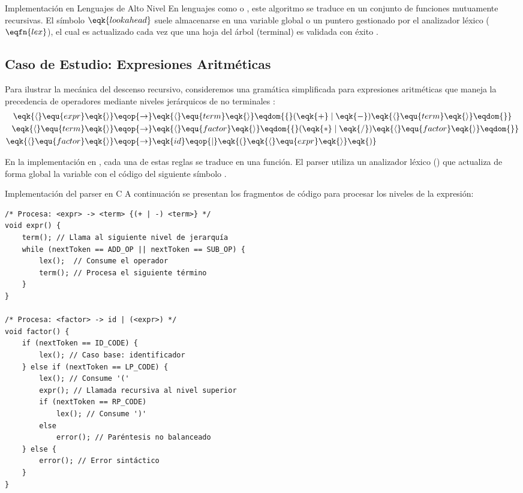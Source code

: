 \begin{observacion}{Implementación en Lenguajes de Alto Nivel}
En lenguajes como  o , este algoritmo se traduce en un conjunto de funciones mutuamente recursivas. El símbolo $\eqk{lookahead}$ suele almacenarse en una variable global o un puntero gestionado por el analizador léxico ($\eqfn{lex}$), el cual es actualizado cada vez que una hoja del árbol (terminal) es validada con éxito \cite{aho2006compilers}.
\end{observacion}

\subsection{Caso de Estudio: Expresiones Aritméticas}
\label{subsec:3_5_4_caso_estudio}

Para ilustrar la mecánica del descenso recursivo, consideremos una gramática simplificada para expresiones aritméticas que maneja la precedencia de operadores mediante niveles jerárquicos de no terminales \cite{aho2006compilers}:
\begin{align*}
\eqk{\langle} \equ{expr} \eqk{\rangle} &\eqop{\rightarrow} \eqk{\langle} \equ{term} \eqk{\rangle} \eqdom{\{} (\eqk{+} \mid \eqk{-}) \eqk{\langle} \equ{term} \eqk{\rangle} \eqdom{\}} \\
\eqk{\langle} \equ{term} \eqk{\rangle} &\eqop{\rightarrow} \eqk{\langle} \equ{factor} \eqk{\rangle} \eqdom{\{} (\eqk{*} \mid \eqk{/}) \eqk{\langle} \equ{factor} \eqk{\rangle} \eqdom{\}} \\
\eqk{\langle} \equ{factor} \eqk{\rangle} &\eqop{\rightarrow} \eqk{id} \eqop{\mid} \eqk{(} \eqk{\langle} \equ{expr} \eqk{\rangle} \eqk{)}
\end{align*}

En la implementación en , cada una de estas reglas se traduce en una función. El parser utiliza un analizador léxico () que actualiza de forma global la variable  con el código del siguiente símbolo \cite{aho2006compilers}.

\begin{ejemplo}{Implementación del parser en C}
A continuación se presentan los fragmentos de código para procesar los niveles de la expresión:

\begin{lstlisting}[style=c, caption={Funciones de descenso recursivo para expresiones}]
/* Procesa: <expr> -> <term> {(+ | -) <term>} */
void expr() {
    term(); // Llama al siguiente nivel de jerarquía
    while (nextToken == ADD_OP || nextToken == SUB_OP) {
        lex();  // Consume el operador
        term(); // Procesa el siguiente término
    }
}

/* Procesa: <factor> -> id | (<expr>) */
void factor() {
    if (nextToken == ID_CODE) {
        lex(); // Caso base: identificador
    } else if (nextToken == LP_CODE) {
        lex(); // Consume '('
        expr(); // Llamada recursiva al nivel superior
        if (nextToken == RP_CODE)
            lex(); // Consume ')'
        else
            error(); // Paréntesis no balanceado
    } else {
        error(); // Error sintáctico
    }
}
\end{lstlisting}
\end{ejemplo}

